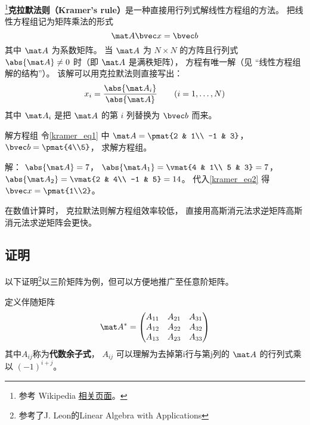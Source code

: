 
\begin{issues}
\issueTODO
\end{issues}


\footnote{参考 Wikipedia \href{https://en.wikipedia.org/wiki/Cramer's_rule}{相关页面}。}\textbf{克拉默法则（Kramer's rule）}是一种直接用行列式解线性方程组的方法。 把线性方程组记为矩阵乘法的形式
\begin{equation}\label{kramer_eq1}
\mat A \bvec x = \bvec b
\end{equation}
其中 $\mat A$ 为系数矩阵。 当 $\mat A$ 为 $N\times N$ 的方阵且行列式 $\abs{\mat A} \ne 0$ 时（即 $\mat A$ 是满秩矩阵）， 方程有唯一解（见 “线性方程组解的结构”）。 该解可以用克拉默法则直接写出：
\begin{equation}\label{kramer_eq2}
x_i = \frac{\abs{\mat A_i}}{\abs{\mat A}} \qquad (i = 1, \dots, N)
\end{equation}
其中 $\mat A_i$ 是把 $\mat A$ 的第 $i$ 列替换为 $\bvec b$ 而来。

\begin{example}{解方程组}
令\autoref{kramer_eq1} 中 $\mat A = \pmat{2 & 1\\ -1 & 3}$， $\bvec b = \pmat{4\\5}$， 求解方程组。

解： $\abs{\mat A} = 7$， $\abs{\mat A_1} = \vmat{4 & 1\\ 5 & 3} = 7$， $\abs{\mat A_2} = \vmat{2 & 4\\ -1 & 5} = 14$。 代入\autoref{kramer_eq2} 得 $\bvec x = \pmat{1\\2}$。
\end{example}

在数值计算时， 克拉默法则解方程组效率较低， 直接用高斯消元法求逆矩阵高斯消元法求逆矩阵会更快。

\subsection{证明}

以下证明\footnote{参考了J. Leon的Linear Algebra with Applications}以三阶矩阵为例，但可以方便地推广至任意阶矩阵。

定义伴随矩阵
\begin{equation}
\mat A^*=
\begin{pmatrix}
A_{11}&A_{21}&A_{31}\\
A_{12}&A_{22}&A_{32}\\
A_{13}&A_{23}&A_{33}\\
\end{pmatrix}
\end{equation}
其中$A_{ij}$称为\textbf{代数余子式}， $A_{ij}$ 可以理解为去掉第i行与第j列的 $\mat A$ 的行列式乘以 $(-1)^{i+j}$。

